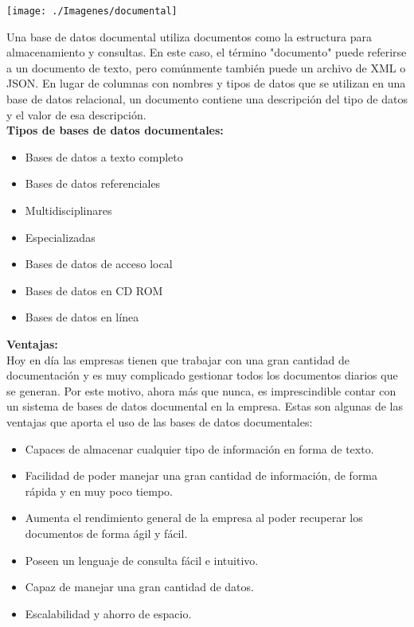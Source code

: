 \documentclass[twoside,twocolumn]{article}
\begin{document}
\begin{center}
	\texttt{[image: ./Imagenes/documental]} 
\end{center}


Una base de datos documental utiliza documentos como la estructura para almacenamiento y consultas. En este caso, el término "documento" puede referirse a un documento de texto, pero comúnmente también puede un archivo de XML o JSON. En lugar de columnas con nombres y tipos de datos que se utilizan en una base de datos relacional, un documento contiene una descripción del tipo de datos y el valor de esa descripción.
\\
	\textbf{Tipos de bases de datos documentales:}
\begin{itemize}	

	\item Bases de datos a texto completo
	\item Bases de datos referenciales
	\item Multidisciplinares
	\item Especializadas
	\item Bases de datos de acceso local
	\item Bases de datos en CD ROM
\item Bases de datos en línea
\end{itemize} 

	\textbf{Ventajas:}
\\
Hoy en día las empresas tienen que trabajar con una gran cantidad de documentación y es muy complicado gestionar todos los documentos diarios que se generan. Por este motivo, ahora más que nunca, es imprescindible contar con un sistema de bases de datos documental en la empresa. Estas son algunas de las ventajas que aporta el uso de las bases de datos documentales:
\begin{itemize}	

	\item Capaces de almacenar cualquier tipo de información en forma de texto.
	\item Facilidad de poder manejar una gran cantidad de información, de forma rápida y en muy poco tiempo.
	\item Aumenta el rendimiento general de la empresa al poder recuperar los documentos de forma ágil y fácil.
	\item Poseen un lenguaje de consulta fácil e intuitivo.
	\item Capaz de manejar una gran cantidad de datos.
	\item Escalabilidad y ahorro de espacio.

\end{itemize} 
\end{document}

